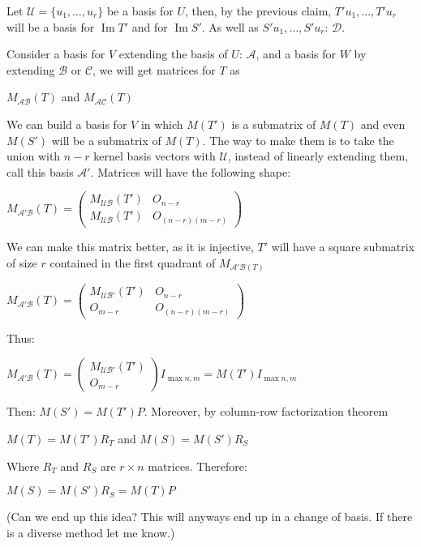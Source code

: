 \documentclass{article}
\theoremstyle{remark}
\begin{document}
\begin{enumerate}
        Let $\mathcal{U} = \{u_1,\dots, u_r\}$ be a basis for $U$, then, by the previous claim, $T'u_1, \dots, T'u_r$ will be a basis for $\operatorname{Im }T'$ and for $\operatorname{Im }S'$.
        As well as $S'u_1, \dots, S'u_r$: $\mathcal{D}$.
        
        Consider a basis for $V$ extending the basis of $U$: $\mathcal{A}$, and a basis for $W$ by extending $\mathcal{B}$ or $\mathcal{C}$,
        we will get matrices for $T$ as
        \begin{center}
            $M_{\mathcal{AB}}(T)$ and $M_{\mathcal{AC}}(T)$
        \end{center}
        We can build a basis for $V$ in which $M(T')$ is a submatrix of $M(T)$
        and even $M(S')$ will be a submatrix of $M(T)$. The way to make them is to take the union with
        $n-r$ kernel basis vectors with $\mathcal{U}$, instead of linearly extending them, call this basis $\mathcal{A'}$.
        Matrices will have the following shape:
        \begin{center}
            $M_{\mathcal{A'B}}(T) =
            \begin{pmatrix}
                M_{\mathcal{UB}}(T') & O_{n-r} \\
                M_{\mathcal{UB}}(T') & O_{(n-r)(m-r)}
            \end{pmatrix}$
        \end{center}
        We can make this matrix better, as it is injective, $T'$ will have a square submatrix of size $r$ contained in 
        the first quadrant of $M_{\mathcal{A'B}(T)}$
        \begin{center}
            $M_{\mathcal{A'B}}(T) =
            \begin{pmatrix}
                M_{\mathcal{UB'}}(T') & O_{n-r} \\
                O_{m-r} & O_{(n-r)(m-r)}
            \end{pmatrix}$
        \end{center}
        Thus:
        \begin{center}
            $M_{\mathcal{A'B}}(T) =
            \begin{pmatrix}
                M_{\mathcal{UB'}}(T') \\
                O_{m-r} 
            \end{pmatrix}
            I_{\max{n,m}} = M(T')I_{\max{n,m}}$
        \end{center}

        Then: $M(S') = M(T')P$. Moreover, by column-row factorization theorem
        \begin{center}
            $M(T) = M(T')R_T$ and $M(S) = M(S')R_S$
        \end{center}
        Where $R_T$ and $R_S$ are $r \times n$ matrices. Therefore:
        \begin{center}
            $M(S) = M(S')R_S = M(T)P$
        \end{center}
        (Can we end up this idea? This will anyways end up in a change of basis. If there is a diverse method let me know.)


\end{enumerate}
\end{document}
